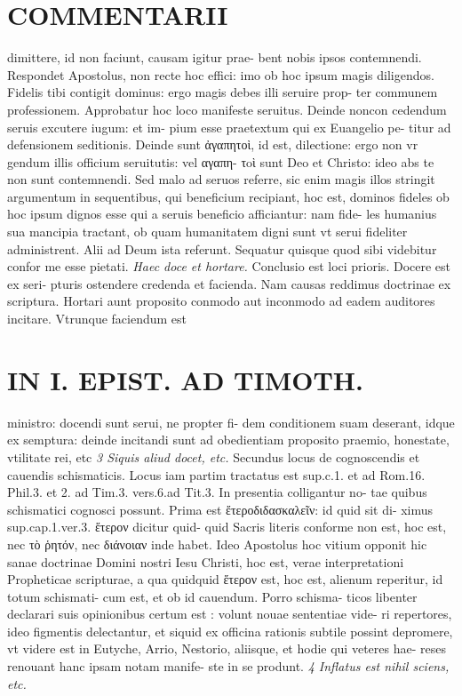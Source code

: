 \documentclass{article}
\begin{document}
\begin{pages}
\section*{COMMENTARII }
\marginpar{[ p.148 ]}\pstart dimittere, id non faciunt, causam igitur prae- bent nobis ipsos contemnendi. Respondet Apostolus, non recte hoc effici: imo ob hoc ipsum magis diligendos. Fidelis tibi contigit dominus: ergo magis debes illi seruire prop- ter communem professionem. Approbatur hoc loco manifeste seruitus. Deinde noncon cedendum seruis excutere iugum: et im- pium esse praetextum qui ex Euangelio pe- titur ad defensionem seditionis. Deinde sunt ἀγαπητοὶ, id est, dilectione: ergo non vr gendum illis officium seruitutis: vel αγαπη- τoὶ sunt Deo et Christo: ideo abs te non sunt contemnendi. Sed malo ad seruos referre, sic enim magis illos stringit argumentum in sequentibus, qui beneficium recipiant, hoc est, dominos fideles ob hoc ipsum dignos esse qui a seruis beneficio afficiantur: nam fide- les humanius sua mancipia tractant, ob quam humanitatem digni sunt vt serui fideliter administrent. Alii ad Deum ista referunt. Sequatur quisque quod sibi videbitur confor me esse pietati.  \pend
\textit{Haec doce et hortare. }\pstart Conclusio est loci prioris. Docere est ex seri- pturis ostendere credenda et facienda. Nam causas reddimus doctrinae ex scriptura. Hortari aunt proposito conmodo aut inconmodo ad eadem auditores incitare. Vtrunque faciendum est  \pend
\section*{IN I. EPIST. AD TIMOTH. }
\marginpar{[ p.149 ]}\pstart ministro: docendi sunt serui, ne propter fi- dem conditionem suam deserant, idque ex semptura: deinde incitandi sunt ad obedientiam proposito praemio, honestate, vtilitate rei, etc  \pend
\textit{3 Siquis aliud docet, etc. }\pstart Secundus locus de cognoscendis et cauendis schismaticis. Locus iam partim tractatus est sup.c.1. et ad Rom.16. Phil.3. et 2. ad Tim.3. vers.6.ad Tit.3. In presentia colligantur no- tae quibus schismatici cognosci possunt.  \pend\pstart Prima est ἔτεροδιδασκαλεῖν: id quid sit di- ximus sup.cap.1.ver.3. ἕτερον dicitur quid- quid Sacris literis conforme non est, hoc est, nec τὸ ῥητόν, nec διάνοιαν inde habet. Ideo Apostolus hoc vitium opponit hic sanae doctrinae Domini nostri Iesu Christi, hoc est, verae interpretationi Propheticae scripturae, a qua quidquid ἕτερον est, hoc est, alienum reperitur, id totum schismati- cum est, et ob id cauendum. Porro schisma- ticos libenter declarari suis opinionibus certum est : volunt nouae sententiae vide- ri repertores, ideo figmentis delectantur, et siquid ex officina rationis subtile possint depromere, vt videre est in Eutyche, Arrio, Nestorio, aliisque, et hodie qui veteres hae- reses renouant hanc ipsam notam manife- ste in se produnt.  \pend
\textit{4 Inflatus est nihil sciens, etc. }

\end{pages}
\end{document}
